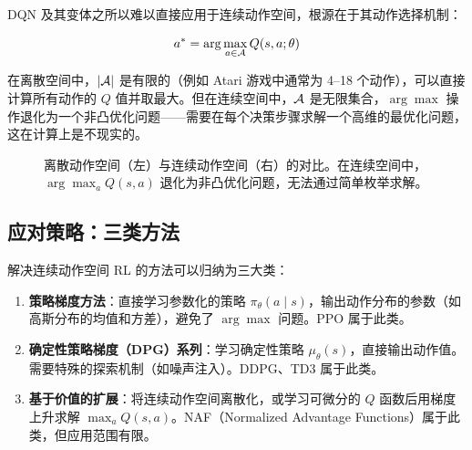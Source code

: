 DQN 及其变体之所以难以直接应用于连续动作空间，根源在于其动作选择机制：

\[
a^* = \arg\max_{a \in \mathcal{A}} Q(s, a; \theta)
\]

在离散空间中，$|\mathcal{A}|$ 是有限的（例如 Atari 游戏中通常为 4--18 个动作），可以直接计算所有动作的 $Q$ 值并取最大。但在连续空间中，$\mathcal{A}$ 是无限集合，$\arg\max$ 操作退化为一个非凸优化问题——需要在每个决策步骤求解一个高维的最优化问题，这在计算上是不现实的。

\begin{figure}[H]
\centering
{}
\caption{离散动作空间（左）与连续动作空间（右）的对比。在连续空间中，$\arg\max_a Q(s,a)$ 退化为非凸优化问题，无法通过简单枚举求解。}
\label{fig:disc_cont}
\end{figure}

\subsection{应对策略：三类方法}

解决连续动作空间 RL 的方法可以归纳为三大类：

\begin{enumerate}
    \item \textbf{策略梯度方法}：直接学习参数化的策略 $\pi_\theta(a \mid s)$，输出动作分布的参数（如高斯分布的均值和方差），避免了 $\arg\max$ 问题。PPO 属于此类。
    
    \item \textbf{确定性策略梯度（DPG）系列}：学习确定性策略 $\mu_\theta(s)$，直接输出动作值。需要特殊的探索机制（如噪声注入）。DDPG、TD3 属于此类。
    
    \item \textbf{基于价值的扩展}：将连续动作空间离散化，或学习可微分的 $Q$ 函数后用梯度上升求解 $\max_a Q(s,a)$。NAF（Normalized Advantage Functions）属于此类，但应用范围有限。
\end{enumerate}

